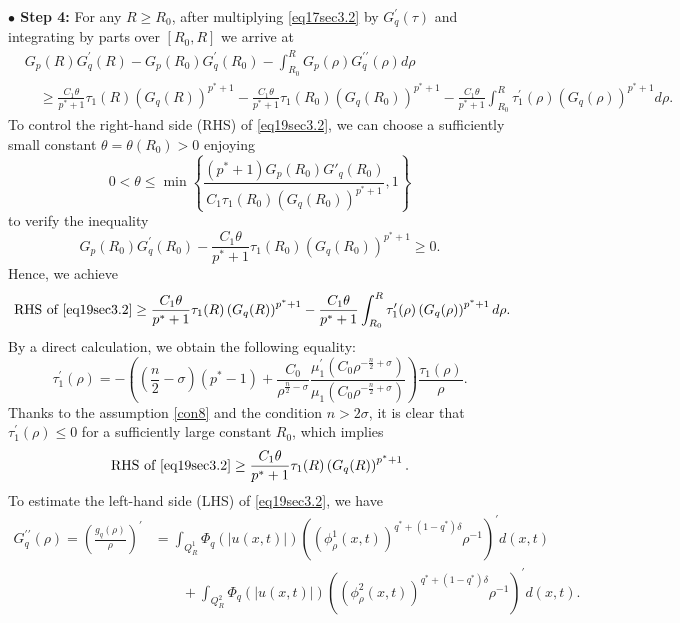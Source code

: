 \documentclass[11pt,reqno]{amsart}
\newcommand{\tron}[1]{\left( #1 \right)}
\numberwithin{equation}{section}
\theoremstyle{plain}
\begin{document}
\noindent\textbf{$\bullet$ Step 4:} For any $R\geq R_0$, after multiplying \eqref{eq17sec3.2} by $G_q^{\prime}(\tau)$ and integrating by parts over $\left[R_0, R\right]$ we arrive at
\begin{equation}\label{eq19sec3.2}
\begin{aligned}
& G_p(R) G_q^{\prime}(R)-G_p\left(R_0\right) G_q^{\prime}\left(R_0\right)-\int^R_{R_0} G_p(\rho) G_q^{\prime \prime}(\rho) d \rho \\
&\quad \geq \frac{C_1\theta}{p^*+1} \tau_1(R)\left(G_q(R)\right)^{p^*+1}-\frac{C_1\theta}{p^*+1} \tau_1\left(R_0\right)\left(G_q\left(R_0\right)\right)^{p^*+1} -\frac{C_1\theta}{p^*+1} \int_{R_0}^R \tau_1^{\prime}(\rho)\left(G_q(\rho)\right)^{p^*+1} d \rho.
\end{aligned}
\end{equation}
To control the right-hand side (RHS) of \eqref{eq19sec3.2}, we can choose a sufficiently small constant $\theta=\theta\left(R_0\right)>0$ enjoying
\[
0<\theta\leq \min\left\{\frac{(p^*+1)G_p(R_0)G'_q(R_0)}{C_1\tau_1(R_0)\tron{G_q(R_0)}^{p^*+1}},1 \right\}
\]
to verify the inequality
$$
G_p\left(R_0\right) G_q^{\prime}\left(R_0\right)-\frac{C_1\theta}{p^*+1} \tau_1\left(R_0\right)\left(G_q\left(R_0\right)\right)^{p^*+1} \geq 0 .
$$
Hence, we achieve
$$
\text { RHS of }\eqref{eq19sec3.2} \geq \frac{C_1\theta}{p^*+1} \tau_1(R)\left(G_q(R)\right)^{p^*+1}-\frac{C_1\theta}{p^*+1} \int_{R_0}^R \tau_1^{\prime}(\rho)\left(G_q(\rho)\right)^{p^*+1} d \rho.
$$
By a direct calculation, we obtain the following equality:
$$
\tau_1^{\prime}(\rho)=-\left(\tron{\frac{n}{2}-\sigma}(p^*-1)+\frac{C_0}{\rho^{\frac{n}{2}-\sigma}}\frac{\mu_1^{\prime}\left(C_0 \rho^{-\frac{n}{2}+\sigma}\right)}{\mu_1\left(C_0 \rho^{-\frac{n}{2}+\sigma}\right)}\right)\frac{\tau_1(\rho)}{\rho}.
$$
Thanks to the assumption \eqref{con8} and the condition $n>2\sigma$, it is clear that $\tau^{\prime}_1(\rho)\leq 0$ for a sufficiently large constant $R_0$, which implies 
\begin{equation}\label{eq20sec3.2}
\text{RHS of }\eqref{eq19sec3.2}\geq \frac{C_1\theta}{p^*+1} \tau_1(R)\left(G_q(R)\right)^{p^*+1}.
\end{equation}
To estimate the left-hand side (LHS) of \eqref{eq19sec3.2}, we have
\[
\begin{aligned}
G_q^{\prime \prime}(\rho)=\tron{\frac{g_q(\rho)}{\rho}}^{\prime}&=\int_{Q^1_{R}} \Phi_q(|u(x, t)|)\left(\left(\phi^1_\rho(x, t)\right)^{q^*+(1-q^*)\delta}\rho^{-1}\right)^{\prime}d(x, t)\\
&\qquad +\int_{Q^2_{R}} \Phi_q(|u(x, t)|)\left(\left(\phi^2_\rho(x, t)\right)^{q^*+(1-q^*)\delta}\rho^{-1}\right)^{\prime}d(x, t).
\end{aligned}
\]
\end{document}
